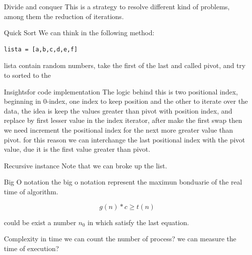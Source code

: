 \documentclass{beamer}
\begin{document}
\begin{frame}[fragile]{Divide and conquer}
This is a strategy to resolve different kind of problems, among them the reduction of iterations.
\end{frame}

\begin{frame}[fragile]{Quick Sort}
We can think in the following method:
\begin{verbatim}
lista = [a,b,c,d,e,f]
\end{verbatim}
lista contain random numbers, take the first of the last and called pivot, and try to sorted to the 

\end{frame}

\begin{frame}[fragile]{Insights}{for code implementation}
The logic behind this is two positional index, 
beginning in 0-index, one index to keep position and the other to iterate over the data,  the idea is keep the values  greater than pivot with position index, and replace by first lesser value in the index iterator, after make the first swap then we need increment the positional index for the next more greater value than pivot.
for this reason we can interchange the last positional index with the pivot value, due it is the first value greater than pivot.
\end{frame}


\begin{frame}[fragile]{Recursive instance}
Note that we can broke up the list. 

\end{frame}




\begin{frame}{Big O notation}
the big o notation represent the maximun bonduarie of the real time of algorithm.

\begin{equation}
g(n)*c \geq t(n)
\end{equation}

could be exist a number $n_{0}$ in which satisfy the last equation.
\end{frame}

\begin{frame}{Complexity in time}
we can count the number of  process?
we can measure the time of execution?

\end{frame}
\end{document}
